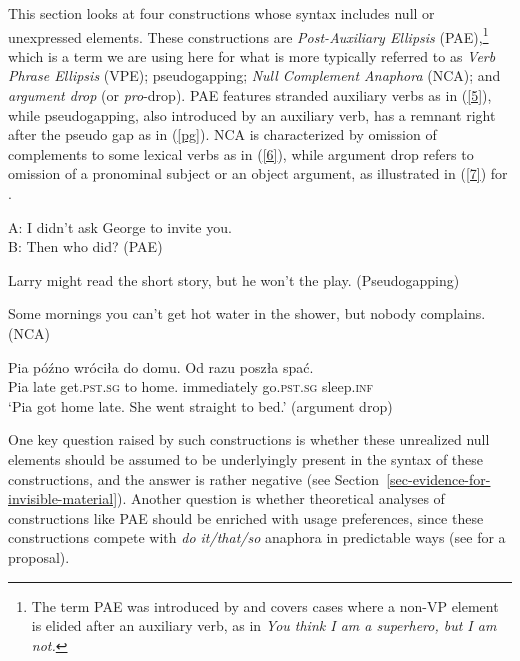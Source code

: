 This section looks at four constructions whose syntax includes null or unexpressed elements. These
constructions are \emph{Post-Auxiliary Ellipsis} (PAE),\footnote{The term PAE was introduced by
  \citet{Sag1976} and covers cases where a non-VP element is elided after an auxiliary verb, as in \emph{You think
  I am a superhero, but I am not.}%
} 
which is a term we are using here for what is more typically referred to as \emph{Verb Phrase Ellipsis}
(VPE); pseudogapping; \emph{Null Complement Anaphora} (NCA); and \emph{argument drop} (or
\emph{pro}-drop). PAE features stranded auxiliary verbs as in (\ref{5}), while pseudogapping, also
introduced by an auxiliary verb, has a remnant right after the pseudo gap as in (\ref{pg}). 
%
%
%
%
 NCA is characterized by omission of complements to some lexical verbs as in (\ref{6}), while argument drop refers to omission of a pronominal subject or an object argument, as illustrated in (\ref{7}) for .

\ea A: I didn't ask George to invite you.\\B: Then who did? (PAE) \label{5}\z

\ea 
Larry might read the short story, but he won't the play.
(Pseudogapping) \label{pg}\z

\ea Some mornings you can't get hot water in the shower, but nobody complains. (NCA) \label{6} \z

\ea
\gll Pia p\'{o}\'{z}no wr\'{o}ci\l a  do domu.    {Od razu}   posz\l    a spa\'{c}.\\
     Pia late          get.\textsc{pst}.\textsc{sg}  to    home.\gen{} immediately go.\textsc{pst}.\textsc{sg} sleep.\textsc{inf}\\
\glt `Pia got home late. She went straight to bed.'
(argument drop) \label{7}
\z
%

\begin{sloppypar}
One key question raised by such constructions
 is whether these unrealized null elements should be assumed to be underlyingly present in the syntax of these constructions, and the answer is rather negative (see Section~\ref{sec-evidence-for-invisible-material}). Another question is whether theoretical analyses of constructions like PAE should be enriched with usage preferences, since these constructions compete with \textit{do it/that/so} anaphora in predictable ways (see \citealt{Miller2013a} for a proposal).
\end{sloppypar}

